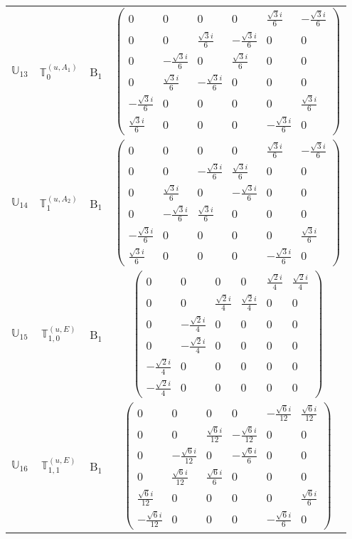 \documentclass[fleqn,10pt,landscape]{article}
\begin{document}
\begin{itemize}
\begin{center}
\begin{longtable}{c|c|c|c}
$ \mathbb{U}_{13} $ & $\mathbb{T}_{0}^{(u,A_{1})}$ & B$_{1}$ & $\begin{pmatrix} 0 & 0 & 0 & 0 & \frac{\sqrt{3} i}{6} & - \frac{\sqrt{3} i}{6} \\ 0 & 0 & \frac{\sqrt{3} i}{6} & - \frac{\sqrt{3} i}{6} & 0 & 0 \\ 0 & - \frac{\sqrt{3} i}{6} & 0 & \frac{\sqrt{3} i}{6} & 0 & 0 \\ 0 & \frac{\sqrt{3} i}{6} & - \frac{\sqrt{3} i}{6} & 0 & 0 & 0 \\ - \frac{\sqrt{3} i}{6} & 0 & 0 & 0 & 0 & \frac{\sqrt{3} i}{6} \\ \frac{\sqrt{3} i}{6} & 0 & 0 & 0 & - \frac{\sqrt{3} i}{6} & 0 \end{pmatrix}$ \\
$ \mathbb{U}_{14} $ & $\mathbb{T}_{1}^{(u,A_{2})}$ & B$_{1}$ & $\begin{pmatrix} 0 & 0 & 0 & 0 & \frac{\sqrt{3} i}{6} & - \frac{\sqrt{3} i}{6} \\ 0 & 0 & - \frac{\sqrt{3} i}{6} & \frac{\sqrt{3} i}{6} & 0 & 0 \\ 0 & \frac{\sqrt{3} i}{6} & 0 & - \frac{\sqrt{3} i}{6} & 0 & 0 \\ 0 & - \frac{\sqrt{3} i}{6} & \frac{\sqrt{3} i}{6} & 0 & 0 & 0 \\ - \frac{\sqrt{3} i}{6} & 0 & 0 & 0 & 0 & \frac{\sqrt{3} i}{6} \\ \frac{\sqrt{3} i}{6} & 0 & 0 & 0 & - \frac{\sqrt{3} i}{6} & 0 \end{pmatrix}$ \\
$ \mathbb{U}_{15} $ & $\mathbb{T}_{1,0}^{(u,E)}$ & B$_{1}$ & $\begin{pmatrix} 0 & 0 & 0 & 0 & \frac{\sqrt{2} i}{4} & \frac{\sqrt{2} i}{4} \\ 0 & 0 & \frac{\sqrt{2} i}{4} & \frac{\sqrt{2} i}{4} & 0 & 0 \\ 0 & - \frac{\sqrt{2} i}{4} & 0 & 0 & 0 & 0 \\ 0 & - \frac{\sqrt{2} i}{4} & 0 & 0 & 0 & 0 \\ - \frac{\sqrt{2} i}{4} & 0 & 0 & 0 & 0 & 0 \\ - \frac{\sqrt{2} i}{4} & 0 & 0 & 0 & 0 & 0 \end{pmatrix}$ \\
$ \mathbb{U}_{16} $ & $\mathbb{T}_{1,1}^{(u,E)}$ & B$_{1}$ & $\begin{pmatrix} 0 & 0 & 0 & 0 & - \frac{\sqrt{6} i}{12} & \frac{\sqrt{6} i}{12} \\ 0 & 0 & \frac{\sqrt{6} i}{12} & - \frac{\sqrt{6} i}{12} & 0 & 0 \\ 0 & - \frac{\sqrt{6} i}{12} & 0 & - \frac{\sqrt{6} i}{6} & 0 & 0 \\ 0 & \frac{\sqrt{6} i}{12} & \frac{\sqrt{6} i}{6} & 0 & 0 & 0 \\ \frac{\sqrt{6} i}{12} & 0 & 0 & 0 & 0 & \frac{\sqrt{6} i}{6} \\ - \frac{\sqrt{6} i}{12} & 0 & 0 & 0 & - \frac{\sqrt{6} i}{6} & 0 \end{pmatrix}$ \\

\end{longtable}
\end{center}
\end{itemize}
\end{document}
